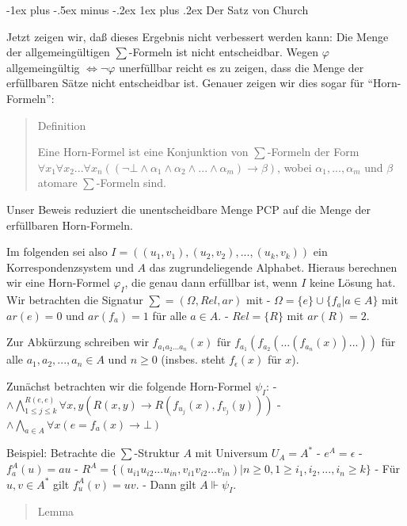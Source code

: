 \documentclass[a4paper]{article}
\makeatletter
\renewcommand{\subsubsection}{\@startsection{subsubsection}{3}{0mm}%
                {-1ex plus -.5ex minus -.2ex}%
                {1ex plus .2ex}%
                {\normalfont\small\bfseries}}
\makeatother
\begin{document}
\begin{multicols}{3}
  \subsubsection{Der Satz von Church}\label{der-satz-von-church}

  Jetzt zeigen wir, daß dieses Ergebnis nicht verbessert werden kann: Die
  Menge der allgemeingültigen $\sum$-Formeln ist nicht entscheidbar. Wegen
  $\varphi$ allgemeingültig $\Leftrightarrow\lnot\varphi$ unerfüllbar
  reicht es zu zeigen, dass die Menge der erfüllbaren Sätze nicht
  entscheidbar ist. Genauer zeigen wir dies sogar für ``Horn-Formeln'':

  \begin{quote}
    Definition

    Eine Horn-Formel ist eine Konjunktion von $\sum$-Formeln der Form
    $\forall x_1 \forall x_2 ...\forall x_n((\lnot\bot \wedge\alpha_1\wedge\alpha_2\wedge...\wedge\alpha_m)\rightarrow\beta)$,
    wobei $\alpha_1,...,\alpha_m$ und $\beta$ atomare $\sum$-Formeln sind.
  \end{quote}

  Unser Beweis reduziert die unentscheidbare Menge PCP auf die Menge der
  erfüllbaren Horn-Formeln.

  Im folgenden sei also $I=((u_1,v_1),(u_2,v_2),...,(u_k,v_k))$ ein
  Korrespondenzsystem und $A$ das zugrundeliegende Alphabet. Hieraus
  berechnen wir eine Horn-Formel $\varphi_I$, die genau dann erfüllbar
  ist, wenn $I$ keine Lösung hat. Wir betrachten die Signatur
  $\sum= (\Omega,Rel,ar)$ mit - $\Omega=\{e\}\cup\{f_a|a\in A\}$ mit
  $ar(e) =0$ und $ar(f_a) =1$ für alle $a\in A$. - $Rel=\{R\}$ mit
  $ar(R)=2$.

  Zur Abkürzung schreiben wir $f_{a_1 a_2 ...a_n} (x)$ für
  $f_{a_1}(f_{a_2}(...(f_{a_n}(x))...))$ für alle $a_1,a_2,...,a_n\in A$
  und $n\geq 0$ (insbes. steht $f_{\epsilon}(x)$ für $x$).

  Zunächst betrachten wir die folgende Horn-Formel $\psi_I$: -
  $\wedge \bigwedge_{1\leq j \leq k}^{R(e,e)} \forall x,y(R(x,y)\rightarrow R(f_{u_j}(x),f_{v_j}(y)))$
  - $\wedge \bigwedge_{a\in A} \forall x(e=f_a(x)\rightarrow \bot)$

  Beispiel: Betrachte die $\sum$-Struktur $A$ mit Universum $U_A=A^*$ -
  $e^A=\epsilon$ - $f_a^A(u) =au$ -
  $R^A=\{(u_{i1} u_{i2} ...u_{in},v_{i1} v_{i2} ...v_{in})|n\geq 0 , 1\geq i_1,i_2,...,i_n\geq k\}$
  - Für $u,v\in A^*$ gilt $f_u^A(v) =uv$. - Dann gilt $A\Vdash \psi_I$.

  \begin{quote}
    Lemma


\end{quote}
\end{multicols}
\end{document}
